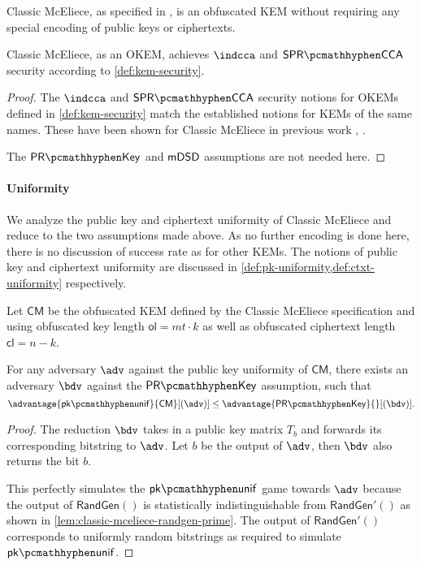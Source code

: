 \begin{theorem}
    Classic McEliece, as specified in \cite{NISTPQC-R4:ClassicMcEliece22}, is an obfuscated KEM without requiring any special encoding of public keys or ciphertexts.

    Classic McEliece, as an OKEM, achieves $\indcca$ and $\sprcca$ security according to \cref{def:kem-security}.
\end{theorem}
\begin{proof}
    The $\indcca$ and $\sprcca$ security notions for OKEMs defined in \cref{def:kem-security} match the established notions for KEMs of the same names. These have been shown for Classic McEliece in previous work \cite{EC:Xagawa22}, \cite[security.pdf: Section 5]{NISTPQC-R4:ClassicMcEliece22}.

    The $\prkey$ and $\mathsf{mDSD}$ assumptions are not needed here.
\end{proof}

\paragraph{Uniformity}

We analyze the public key and ciphertext uniformity of Classic McEliece and reduce to the two assumptions made above. As no further encoding is done here, there is no discussion of success rate as for other KEMs.
The notions of public key and ciphertext uniformity are discussed in \cref{def:pk-uniformity,def:ctxt-uniformity} respectively.

\begin{lemma}
\label{lem:classic-mceliece-pk-unif}
    Let $\mathsf{CM}$ be the obfuscated KEM defined by the Classic McEliece specification \cite{NISTPQC-R4:ClassicMcEliece22} and using obfuscated key length $\mathsf{ol} = mt \cdot k$ as well as obfuscated ciphertext length $\mathsf{cl} = n-k$.
    
    For any adversary $\adv$ against the public key uniformity of $\mathsf{CM}$, there exists an adversary $\bdv$ against the $\prkey$ assumption, such that
    \[
        \advantage{\pkunif}{\mathsf{CM}}[(\adv)]
        \leq \advantage{\prkey}{}[(\bdv)].
    \]
\end{lemma}
\begin{proof}
    The reduction $\bdv$ takes in a public key matrix $T_b$ and forwards its corresponding bitstring to $\adv$. Let $b$ be the output of $\adv$, then $\bdv$ also returns the bit $b$.

    This perfectly simulates the $\pkunif$ game towards $\adv$ because the output of $\textsf{RandGen}()$ is statistically indistinguishable from $\textsf{RandGen}'()$ as shown in \cref{lem:classic-mceliece-randgen-prime}. The output of $\textsf{RandGen}'()$ corresponds to uniformly random bitstrings as required to simulate $\pkunif$.
\end{proof}

